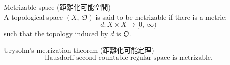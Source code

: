 \documentclass[english,dvipdfmx]{jsarticle}
\begin{document}
\begin{description}
\begin{enumerate}
        \end{enumerate}

        
    

    \item[\bf{Definition:}] Metrizable space (距離化可能空間) \\
        A topological space $(X,\ \mathfrak{O})$ is said to be metrizable if there is a metric:
        $$ d: X \times X \mapsto [0,\ \infty) $$
        such that the topology induced by $d$ is $\mathfrak{O}$.

    \item[\bf{Theorem:}] Urysohn's metrization theorem (距離化可能定理) \\
        $$ \text{Hausdorff second-countable regular space is metrizable.} $$
        
    

\end{description}
\end{document}
